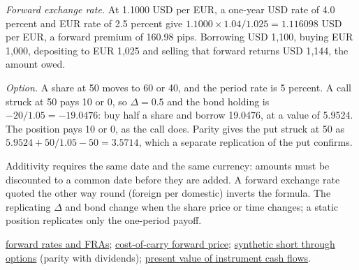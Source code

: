 \begin{qfresult}
\emph{Forward exchange rate.} At 1.1000 USD per EUR, a one-year USD rate of 4.0 percent and EUR rate of 2.5 percent give $1.1000\times1.04/1.025=1.116098$ USD per EUR, a forward premium of 160.98 pips. Borrowing USD 1{,}100, buying EUR 1{,}000, depositing to EUR 1{,}025 and selling that forward returns USD 1{,}144, the amount owed.

\emph{Option.} A share at 50 moves to 60 or 40, and the period rate is 5 percent. A call struck at 50 pays 10 or 0, so $\Delta=0.5$ and the bond holding is $-20/1.05=-19.0476$: buy half a share and borrow 19.0476, at a value of 5.9524. The position pays 10 or 0, as the call does. Parity gives the put struck at 50 as $5.9524+50/1.05-50=3.5714$, which a separate replication of the put confirms.

 Additivity requires the same date and the same currency: amounts must be discounted to a common date before they are added. A forward exchange rate quoted the other way round (foreign per domestic) inverts the formula. The replicating $\Delta$ and bond change when the share price or time changes; a static position replicates only the one-period payoff.

 \hyperref[mod:forward-rates-fra]{forward rates and FRAs}; \hyperref[res:cost-of-carry-forward-price]{cost-of-carry forward price}; \hyperref[res:synthetic-short-put-call]{synthetic short through options} (parity with dividends); \hyperref[meth:instrument-present-value]{present value of instrument cash flows}.

\end{qfresult}
